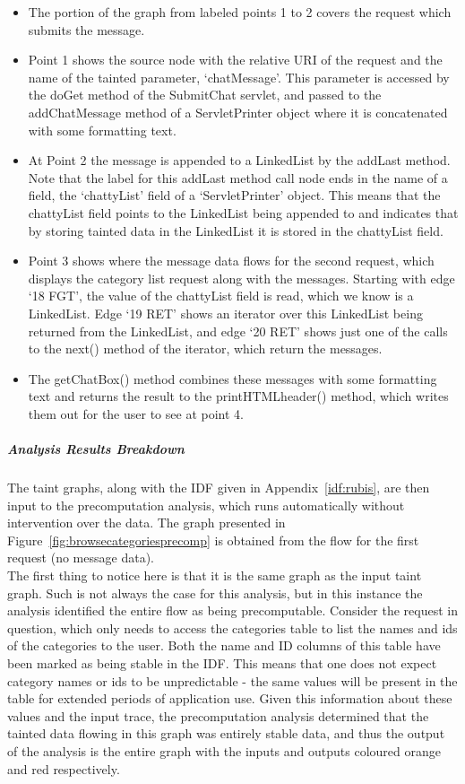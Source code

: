 \documentclass[msc,oneside]{ubcthesis}
\begin{document}
\begin{itemize}
\item The portion of the graph from labeled points 1 to 2 covers the request which submits the message. 
\item Point 1 shows the source node with the relative URI of the request and the name of the tainted parameter, `chatMessage'. This parameter is accessed by the doGet method of the SubmitChat servlet, and passed to the addChatMessage method of a ServletPrinter object where it is concatenated with some formatting text.
\item At Point 2 the message is appended to a LinkedList by the addLast method. Note that the label for this addLast method call node ends in the name of a field, the `chattyList' field of a `ServletPrinter' object. This means that the chattyList field points to the LinkedList being appended to and indicates that by storing tainted data in the LinkedList it is stored in the chattyList field.
\item Point 3 shows where the message data flows for the second request, which displays the category list request along with the messages. Starting with edge `18 FGT', the value of the chattyList field is read, which we know is a LinkedList. Edge `19 RET' shows an iterator over this LinkedList being returned from the LinkedList, and edge `20 RET' shows just one of the calls to the next() method of the iterator, which return the messages.
\item The getChatBox() method combines these messages with some formatting text and returns the result to the printHTMLheader() method, which writes them out for the user to see at point 4.
\end{itemize}
 
\subparagraph{Analysis Results Breakdown}
The taint graphs, along with the IDF given in Appendix~\ref{idf:rubis}, are then input to the precomputation analysis, which runs automatically without intervention over the data. The graph presented in Figure~\ref{fig:browsecategoriesprecomp} is obtained from the flow for the first request (no message data). \\

The first thing to notice here is that it is the same graph as the input taint graph. Such is not always the case for this analysis, but in this instance the analysis identified the entire flow as being precomputable. Consider the request in question, which only needs to access the categories table to list the names and ids of the categories to the user. Both the name and ID columns of this table have been marked as being stable in the IDF. This means that one does not expect category names or ids to be unpredictable - the same values will be present in the table for extended periods of application use. Given this information about these values and the input trace, the precomputation analysis determined that the tainted data flowing in this graph was entirely stable data, and thus the output of the analysis is the entire graph with the inputs and outputs coloured orange and red respectively.\\
\end{document}
